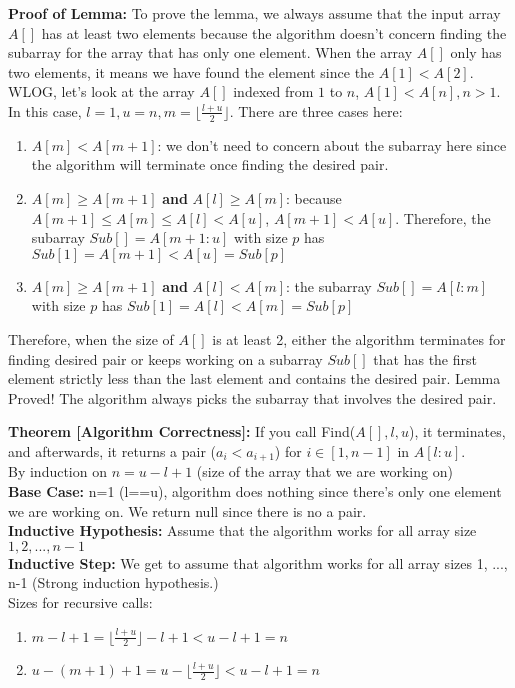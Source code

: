 \documentclass{article}
\begin{document}
\textbf{Proof of Lemma:} To prove the lemma, we always assume that the input array $A[]$ has at least two elements because the algorithm doesn't concern finding the subarray for the array that has only one element. When the array $A[]$ only has two elements, it means we have found the element since the $A[1]<A[2]$. WLOG, let's look at the array $A[]$ indexed from $1$ to $n$, $A[1] < A[n], n>1$. In this case, $l = 1, u = n, m=\lfloor \frac{l+u}{2}\rfloor$. There are three cases here:
\begin{enumerate}
    \item $A[m] < A[m+1]$: we don't need to concern about the subarray here since the algorithm will terminate once finding the desired pair.
    \item $A[m] \geq A[m+1]$ \textbf{and} $A[l] \geq A[m]$: because $A[m+1] \leq A[m] \leq A[l] < A[u]$, $A[m+1] < A[u]$. Therefore, the subarray $Sub[] = A[m+1:u]$ with size $p$ has $Sub[1] = A[m+1] < A[u] = Sub[p]$
    \item $A[m] \geq A[m+1]$ \textbf{and} $A[l] < A[m]$: the subarray $Sub[]=A[l:m]$ with size $p$ has $Sub[1] = A[l] < A[m] = Sub[p]$
\end{enumerate}
Therefore, when the size of $A[]$ is at least 2, either the algorithm terminates for finding desired pair or keeps working on a subarray $Sub[]$ that has the first element strictly less than the last element and contains the desired pair. Lemma Proved! The algorithm always picks the subarray that involves the desired pair.

\textbf{Theorem [Algorithm Correctness]:} If you call Find($A[ ], l, u$), it terminates, and afterwards, it returns a pair ($a_i<a_{i+1}$) for $i\in [1,n-1]$ in $A[l:u]$.
\\By induction on $n = u-l+1$ (size of the array that we are working on)
\\\textbf{Base Case:} n=1 (l==u), algorithm does nothing since there's only one element we are working on. We return null since there is no a pair.
\\\textbf{Inductive Hypothesis:} Assume that the algorithm works for all array size $1, 2, ..., n-1$
\\\textbf{Inductive Step:} We get to assume that algorithm works
for all array sizes 1, ..., n-1 (Strong induction hypothesis.) 
\\Sizes for recursive calls:
\begin{enumerate}
    \item $m-l+1 = \lfloor \frac{l+u}{2}\rfloor - l + 1 < u-l+1=n$
    \item $u-(m+1)+1 = u-\lfloor \frac{l+u}{2}\rfloor < u-l+1=n$
\end{enumerate}
\end{document}
